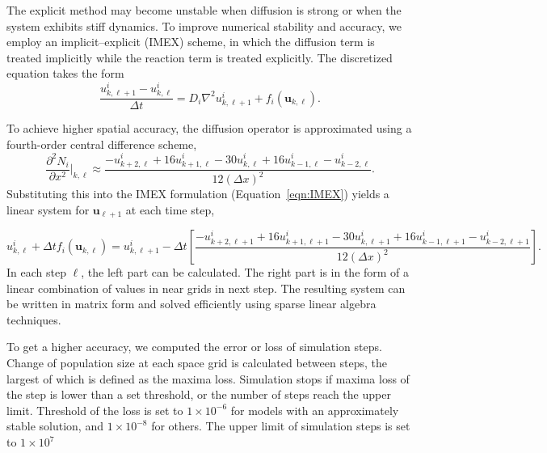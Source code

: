         The explicit method may become unstable when diffusion is strong or when the system exhibits stiff dynamics. To improve numerical stability and accuracy, we employ an implicit--explicit (IMEX) scheme, in which the diffusion term is treated implicitly while the reaction term is treated explicitly. The discretized equation takes the form
        \begin{equation}\label{eqn:IMEX}
            \frac{u_{k,\ell+1}^i - u_{k,\ell}^i}{\Delta t}
            = D_i \nabla^2 u_{k,\ell+1}^i + f_i(\mathbf{u}_{k,\ell}).
        \end{equation}

        To achieve higher spatial accuracy, the diffusion operator is approximated using a fourth-order central difference scheme,
        \begin{equation*}
            \frac{\partial^2 N_i}{\partial x^2} \bigg|_{k,\ell}
            \approx
            \frac{-u_{k+2,\ell}^i + 16 u_{k+1,\ell}^i - 30 u_{k,\ell}^i + 16 u_{k-1,\ell}^i - u_{k-2,\ell}^i}{12(\Delta x)^2}.
        \end{equation*}
        Substituting this into the IMEX formulation (Equation~\ref{eqn:IMEX}) yields a linear system for $\mathbf{u}_{\ell+1}$ at each time step,
        
        \begin{equation}
            u_{k,\ell}^i + \Delta t f_i(\mathbf{u}_{k,\ell}) = u_{k,\ell+1}^i 
            - \Delta t \left[
                \frac{-u_{k+2,\ell+1}^i + 16 u_{k+1,\ell+1}^i - 30 u_{k,\ell+1}^i + 16 u_{k-1,\ell+1}^i - u_{k-2,\ell+1}^i}{12(\Delta x)^2}
            \right].
        \end{equation}
        In each step $\ell$, the left part can be calculated. The right part is in the form of a linear combination of values in near grids in next step. The resulting system can be written in matrix form and solved efficiently using sparse linear algebra techniques.

        To get a higher accuracy, we computed the error or loss of simulation steps. Change of population size at each space grid is calculated between steps, the largest of which is defined as the maxima loss. Simulation stops if maxima loss of the step is lower than a set threshold, or the number of steps reach the upper limit. Threshold of the loss is set to $1 \times 10^{-6}$ for models with an approximately stable solution, and $1 \times 10^{-8}$ for others. The upper limit of simulation steps is set to $1 \times 10^{7}$

